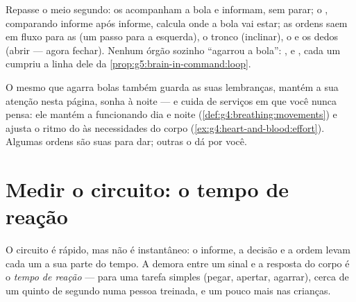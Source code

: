 \begin{example}\label{ex:g5:brain-in-command:catch}
Repasse o meio segundo: os  acompanham a bola e informam, sem
parar; o , comparando informe após informe, calcula onde a
bola vai estar; as ordens saem em fluxo para as  (um passo
para a esquerda), o tronco (inclinar), o  e os dedos (abrir ---
agora fechar). Nenhum órgão sozinho ``agarrou a bola'': ,
 e , cada um cumpriu a linha dele da
\cref{prop:g5:brain-in-command:loop}.
\end{example}

\begin{remark}\label{rem:g5:brain-in-command:more}
O mesmo  que agarra bolas também guarda as suas lembranças,
mantém a sua atenção nesta página, sonha à noite --- e cuida de
serviços em que você nunca pensa: ele mantém a 
funcionando dia e noite (\cref{def:g4:breathing:movements}) e ajusta
o ritmo do  às necessidades do corpo
(\cref{ex:g4:heart-and-blood:effort}). Algumas ordens são suas para
dar; outras o  dá por você.
\end{remark}

\section{Medir o circuito: o tempo de reação}

\begin{definition}\label{def:g5:brain-in-command:reaction}
O circuito é rápido, mas não é instantâneo: o informe, a decisão e a
ordem levam cada um a sua parte do tempo. A demora entre um sinal e
a resposta do corpo é o \emph{tempo de reação}
--- para uma tarefa simples (pegar, apertar, agarrar), cerca
de um quinto de segundo numa pessoa treinada, e um pouco mais nas
crianças.
\end{definition}

